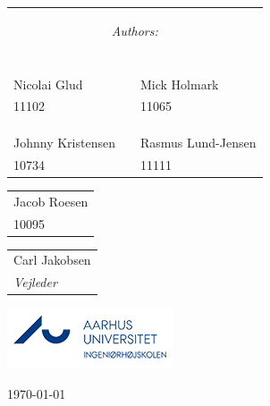 \begin{center}
\begin{table}[H]
\centering
\begin{tabular}{p{4cm} c p{4cm}}
\multicolumn{3}{c}{\begin{Large}\textit{Authors:}\end{Large}}\\
\\
\\
\\
\cline{1-1} \cline{3-3}\\
Nicolai Glud & & Mick Holmark \\
11102 & & 11065\\
\\
\\
\cline{1-1} \cline{3-3}\\
Johnny Kristensen  & & Rasmus Lund-Jensen  \\
10734 & & 11111 \\
\end{tabular}
\end{table}
\begin{table}[H]
\centering
\begin{tabular}{p{4cm}}
\cline{1-1}\\
Jacob Roesen \\
10095
\end{tabular}
\end{table}
\begin{table}[H]
\centering
\begin{tabular}{p{4cm}}
\cline{1-1}\\
Carl Jakobsen\\
\textit{Vejleder}
\end{tabular}
\end{table}



\includegraphics{billeder/iha_logo_da.png}\\[1cm] %
 

\vfill %

{\large \today}\\[3cm] %
\end{center}
